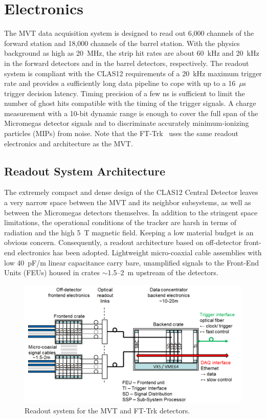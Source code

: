 \section{Electronics}

The MVT data acquisition system is designed to read out 6,000 channels of the forward station and 18,000 channels of
the barrel station. With the physics background as high as 20~MHz, the strip hit rates are about 60~kHz and 20~kHz
in the forward detectors and in the barrel detectors, respectively. The readout system is compliant with the CLAS12
requirements of a 20~kHz maximum trigger rate and provides a sufficiently long data pipeline to cope with up to a
16~$\mu$s trigger decision latency. Timing precision of a few ns is sufficient to limit the number of ghost hits compatible
with the timing of the trigger signals. A charge measurement with a 10-bit dynamic range is enough to cover the full span
of the Micromegas detector signals and to discriminate accurately minimum-ionizing particles (MIPs) from noise. Note
that the FT-Trk~\cite{ft-nim}  uses the same readout electronics and architecture as the MVT.

\subsection{Readout System Architecture}

The extremely compact and dense design of the CLAS12 Central Detector leaves a very narrow space between the MVT
and its neighbor subsystems, as well as between the Micromegas detectors themselves.  In addition to the stringent space
limitations, the operational conditions of the tracker are harsh in terms of radiation and the high 5~T magnetic field.
Keeping a low material budget is an obvious concern. Consequently, a readout architecture based on off-detector front-end
electronics has been adopted. Lightweight micro-coaxial cable assemblies with low 40~pF/m linear capacitance carry bare,
unamplified signals to the Front-End Units (FEUs) housed in crates $\sim$1.5--2~m upstream of the detectors. 

\begin{figure}[htb]
\begin{center}
 \includegraphics[width=1.6\columnwidth,keepaspectratio]{images/electronics_fig1.png}
\end{center}
 \caption{Readout system for the MVT and FT-Trk detectors.}
 \label{fig:mm-e_1}
\end{figure}


